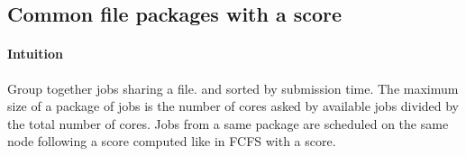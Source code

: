 \documentclass[a4paper]{article}
\begin{document}
\subsection{Common file packages with a score}
\paragraph{Intuition}
Group together jobs sharing a file. and sorted by submission time. The maximum size of a package of jobs is
the number of cores asked by available jobs divided by the total number of cores. Jobs from a same package are 
scheduled on the same node following a score computed like in FCFS with a score.
\end{document}
